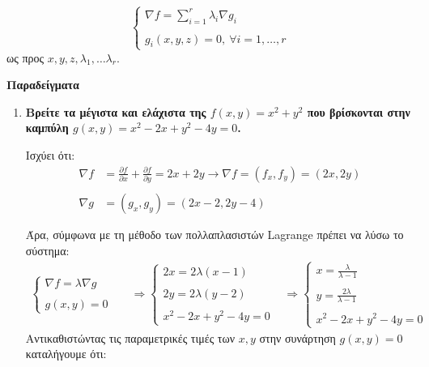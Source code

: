 \[
\begin{cases} 
\nabla f = \sum_{i=1}^{r} \lambda_i \nabla g_i \\ \\
g_i(x,y,z) = 0, \ \forall i=1,\dots,r 
\end{cases}
\]
ως προς $x,y,z,\lambda_1, \dots \lambda_r$.

\newpage
\textbf{Παραδείγματα}\\

\begin{enumerate}
    \item\textbf{ Βρείτε τα μέγιστα και ελάχιστα της $f(x,y) = x^2 + y^2$ που βρίσκονται στην καμπύλη $g(x,y) = x^2 - 2x + y^2 - 4y = 0$.}
    
        Ισχύει ότι:
        \begin{align*}
            \nabla f & = \frac{\partial f}{\partial x} + \frac{\partial f}{\partial y} = 2x + 2y \longrightarrow \nabla f = (f_x, f_y) = (2x,2y) \\\\
            \nabla g & = (g_x, g_y) = (2x-2, 2y-4) \\\\
        \end{align*}
        Άρα, σύμφωνα με τη μέθοδο των πολλαπλασιστών Lagrange πρέπει να λύσω το σύστημα:
        \begin{align*}
            \begin{cases}
                \nabla f = \lambda \nabla g \\\\
                g(x,y) = 0
            \end{cases} &&\Rightarrow
            \begin{cases}
                2x = 2\lambda (x-1) \\\\
                2y = 2\lambda (y-2) \\\\
                x^2 -2x + y^2 - 4y = 0
            \end{cases} &\Rightarrow
            \begin{cases}
                x = \frac{\lambda}{\lambda - 1} \\\\
                y = \frac{2\lambda}{\lambda - 1} \\\\
                x^2 -2x + y^2 - 4y = 0
            \end{cases}
        \end{align*}
        Αντικαθιστώντας τις παραμετρικές τιμές των $x,y$ στην συνάρτηση $g(x,y) = 0$ καταλήγουμε ότι:
        

\end{enumerate}
